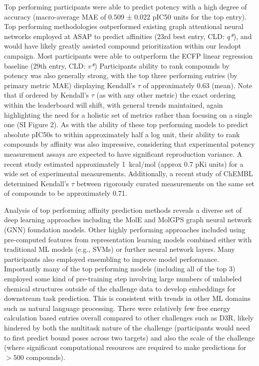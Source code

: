\documentclass[journal=jcim,manuscript=article]{achemso}
\begin{document}
{%
Top performing participants were able to predict potency with a high degree of accuracy (macro-average MAE of 0.509 ± 0.022 pIC50 units for the top entry). Top performing methodologies outperformed existing graph attentional neural networks employed at ASAP to predict affinities (23rd best entry, CLD: \textit{q*}), and would have likely greatly assisted compound prioritization within our leadopt campaign. Most participants were able to outperform the ECFP linear regression baseline (29th entry, CLD: \textit{v*}) Participants ability to rank compounds by potency was also generally strong, with the top three performing entries (by primary metric MAE) displaying Kendall's $\tau$ of approximately 0.63 (mean). Note that if ordered by Kendall's $\tau$ (as with any other metric) the exact ordering within the leaderboard will shift, with general trends maintained, again highlighting the need for a holistic set of metrics rather than focusing on a single one (SI Figure 2). As with the ability of these top performing models to predict absolute pIC50s to within approximately half a log unit, their ability to rank compounds by affinity was also impressive, considering that experimental potency measurement assays are expected to have significant reproduction variance. A recent study estimated approximately 1~kcal/mol (approx 0.7 pKi units)\cite{ross_maximal_2023} for a wide set of experimental measurements. Additionally, a recent study of ChEMBL\cite{landrum_combining_2024} determined Kendall's $\tau$ between rigorously curated measurements on the same set of compounds to be approximately 0.71.

Analysis of top performing affinity prediction methods reveals a diverse set of deep learning approaches including the MolE\cite{mendez-lucio_mole_2024} and MolGPS\cite{sypetkowski2024scalabilitygnnsmoleculargraphs} graph neural network (GNN) foundation models. Other highly performing approaches included using pre-computed features from representation learning models combined either with traditional ML models (e.g., SVMs) or further neural network layers. Many participants also employed ensembling to improve model performance.  Importantly many of the top performing models (including all of the top 3) employed some kind of pre-training step involving large numbers of unlabeled chemical structures outside of the challenge data to develop embeddings for downstream task prediction. This is consistent with trends in other ML domains such as natural language processing\cite{radford2019language}. There were relatively few free energy calculation based entries overall compared to other challenges such as D3R\cite{parks_gaieb_chiu_yang_shao_walters_jansen_mcgaughey_lewis_bembenek_et}, likely hindered by both the multitask nature of the challenge (participants would need to first predict bound poses across two targets) and also the scale of the challenge (where significant computational resources are required to make predictions for $>500$ compounds).

}
\end{document}
